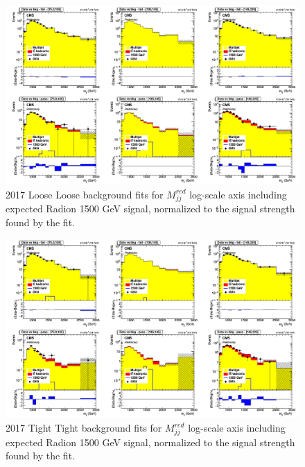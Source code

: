 \begin{figure}[!htb]
	\centering
	\includegraphics[width=1\textwidth]{Figures/postfit_projy_fits_log_17LL.png}
	\caption{2017 Loose Loose background fits for $M_{jj}^{red}$ log-scale axis including expected Radion 1500 GeV signal, normalized to the signal strength found by the fit.}
	\label{fig:17LLlog}
\end{figure}
\begin{figure}[!htb]
	\centering
	\includegraphics[width=1\textwidth]{Figures/postfit_projy_fits_log_17TT.png}
	\caption{2017 Tight Tight background fits for $M_{jj}^{red}$ log-scale axis including expected Radion 1500 GeV signal, normalized to the signal strength found by the fit.}
	\label{fig:17TTlog}
\end{figure}
